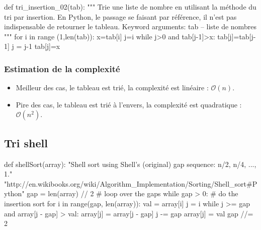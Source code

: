 \documentclass[10pt]{article}
\begin{document}
\begin{minipage}[c]{.48\linewidth}
\begin{py}
\begin{python}
def tri_insertion_02(tab):
    """ 
    Trie une liste de nombre en utilisant la méthode 
    du tri par insertion.
    En Python, le passage se faisant par référence, 
    il n'est pas indispensable de retourner le tableau.
    Keyword arguments:
    tab -- liste de nombres
    """
    for i in range (1,len(tab)):
        x=tab[i]
        j=i
        while j>0 and tab[j-1]>x:
            tab[j]=tab[j-1]
            j = j-1
        tab[j]=x
\end{python}
\end{py}
\end{minipage}
\subsubsection*{Estimation de la complexité}
\begin{itemize}
\item Meilleur des cas, le tableau est trié, la complexité est linéaire : $\mathcal{O}(n)$.
\item Pire des cas, le tableau est trié à l'envers, la complexité est quadratique : $\mathcal{O}(n^2)$.
\end{itemize}



\subsection{Tri shell}
\begin{py}
\begin{python}
def shellSort(array):
     "Shell sort using Shell's (original) gap sequence: n/2, n/4, ..., 1."
     "http://en.wikibooks.org/wiki/Algorithm_Implementation/Sorting/Shell_sort#Python"
     gap = len(array) // 2
     # loop over the gaps
     while gap > 0:
         # do the insertion sort
         for i in range(gap, len(array)):
             val = array[i]
             j = i
             while j >= gap and array[j - gap] > val:
                 array[j] = array[j - gap]
                 j -= gap
             array[j] = val
         gap //= 2
\end{python}
\end{py}
\end{document}
